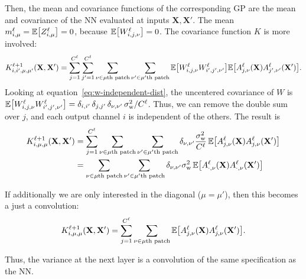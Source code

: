 \documentclass{article}
\newcommand{\vX}{\mathbf{X}}
\newcommand{\patchfun}[1]{{#1}\text{th patch}}
\begin{document}
Then, the mean and covariance functions of the corresponding GP are the mean and covariance of the NN evaluated at inputs $\vX, \vX'$. The mean $m\ssup{\ell}_{i,\mu} = \ExpSymb\sqb{Z\ssup{\ell}_{i,\mu}} = 0$, because $\ExpSymb\sqb{W\ssup{\ell}_{i,j,\nu}}=0$. The covariance function $K$ is more involved:
\begin{equation}
    K\ssup{\ell+1}_{i,i',\mu,\mu'}(\vX, \vX') %
    = \sum_{j=1}^{C\ssup{\ell}} \sum_{j'=1}^{C\ssup{\ell}} \sum_{\nu \in \patchfun{\mu}} \sum_{\nu' \in \patchfun{\mu'}} \ExpSymb\sqb{
    W\ssup{\ell}_{i,j,\nu} W\ssup{\ell}_{i',j',\nu'}} \ExpSymb\sqb{A\ssup{\ell}_{j,\nu}(\vX) A\ssup{\ell}_{j',\nu'}(\vX')}.
  \label{eq:cov-independent}
\end{equation}
Looking at equation~\cref{eq:w-independent-dist}, the uncentered covariance of $W$ is $\ExpSymb\sqb{W\ssup{\ell}_{i,j,\nu}W\ssup{\ell}_{i',j',\nu'}} = \delta_{i,i'} \, \delta_{j, j'} \, \delta_{\nu, \nu'}\, \sigma_\text{w}^2/C\ssup{\ell}$. Thus, we can remove the double sum over $j$, and each output channel $i$ is independent of the others. The result is 
\begin{align}
    K\ssup{\ell+1}_{i,\mu,\mu}(\vX, \vX') %
    &= \sum_{j=1}^{C\ssup{\ell}} \sum_{\nu \in \patchfun{\mu}} \sum_{\nu' \in \patchfun{\mu'}} \delta_{\nu,\nu'} \frac{\sigma^2_\text{w}}{C\ssup{\ell}}\,
    \ExpSymb\sqb{A\ssup{\ell}_{j,\nu}(\vX) A\ssup{\ell}_{j,\nu}(\vX')} \\
    &= \sum_{\nu \in \patchfun{\mu}} \sum_{\nu' \in \patchfun{\mu'}} \delta_{\nu,\nu'} \sigma^2_\text{w}\,
      \ExpSymb\sqb{A\ssup{\ell}_{\cdot,\nu}(\vX) A\ssup{\ell}_{\cdot,\nu}(\vX')} 
\end{align}

If additionally we are only interested in the diagonal ($\mu=\mu'$), then this
becomes a just a convolution:
\begin{equation*}
    K\ssup{\ell+1}_{i,\mu,\mu}(\vX, \vX') %
    = \sum_{j=1}^{C\ssup{\ell}} \sum_{\nu \in \patchfun{\mu}}  \ExpSymb\sqb{A\ssup{\ell}_{j,\nu}(\vX) A\ssup{\ell}_{j,\nu}(\vX')}.
\end{equation*}

Thus, the variance at the next layer is a convolution of the same specification as the NN.
\end{document}
